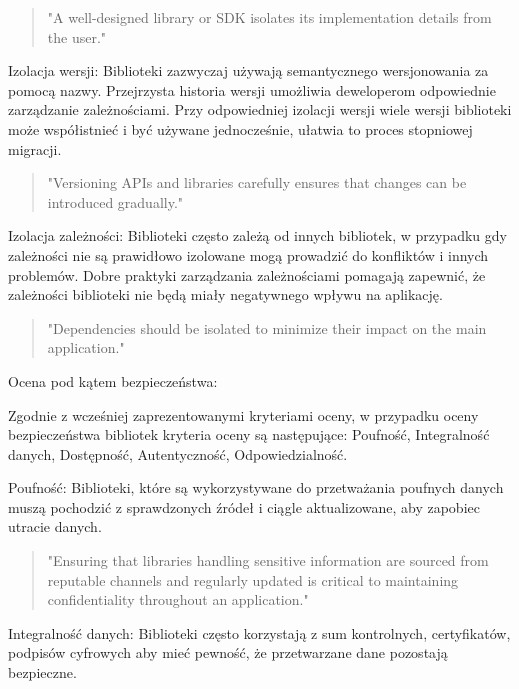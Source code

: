 \documentclass[runningheads,12pt]{llncs}
\begin{document}
\begin{quote}
    "A well-designed library or SDK isolates its implementation details from the user." ~\cite[p. 75]{Essential}
\end{quote}

Izolacja wersji: Biblioteki zazwyczaj używają semantycznego wersjonowania za pomocą nazwy. Przejrzysta historia wersji umożliwia deweloperom odpowiednie zarządzanie zależnościami. Przy odpowiedniej izolacji wersji wiele wersji biblioteki może współistnieć i być używane jednocześnie, ułatwia to proces stopniowej migracji.

\begin{quote}
    "Versioning APIs and libraries carefully ensures that changes can be introduced gradually." ~\cite[p. 172]{fowler2012patterns}
\end{quote}

Izolacja zależności: Biblioteki często zależą od innych bibliotek, w przypadku gdy zależności nie są prawidłowo izolowane mogą prowadzić do konfliktów i innych problemów. Dobre praktyki zarządzania zależnościami pomagają zapewnić, że zależności biblioteki nie będą miały negatywnego wpływu na aplikację.

\begin{quote}
    "Dependencies should be isolated to minimize their impact on the main application." ~\cite[p. 218]{martin2008clean}
\end{quote}

Ocena pod kątem bezpieczeństwa:

Zgodnie z wcześniej zaprezentowanymi kryteriami oceny, w przypadku oceny bezpieczeństwa bibliotek kryteria oceny są następujące: Poufność, Integralność danych, Dostępność, Autentyczność, Odpowiedzialność.

Poufność: Biblioteki, które są wykorzystywane do przetważania poufnych danych muszą pochodzić z sprawdzonych źródeł i ciągle aktualizowane, aby zapobiec utracie danych.

\begin{quote}
    "Ensuring that libraries handling sensitive information are sourced from reputable channels and regularly updated is critical to maintaining confidentiality throughout an application." ~\cite[p. 82]{Essential}
\end{quote}

Integralność danych: Biblioteki często korzystają z sum kontrolnych, certyfikatów, podpisów cyfrowych aby mieć pewność, że przetwarzane dane pozostają bezpieczne.
\end{document}
